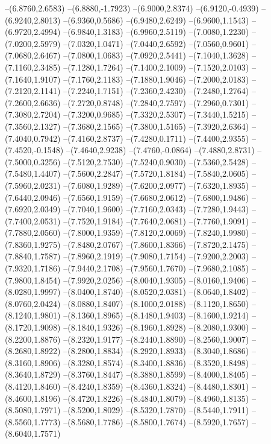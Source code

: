 {\begin{scope}
--(6.8760,2.6583)
--(6.8880,-1.7923)
--(6.9000,2.8374)
--(6.9120,-0.4939)
--(6.9240,2.8013)
--(6.9360,0.5686)
--(6.9480,2.6249)
--(6.9600,1.1543)
--(6.9720,2.4994)
--(6.9840,1.3183)
--(6.9960,2.5119)
--(7.0080,1.2230)
--(7.0200,2.5979)
--(7.0320,1.0471)
--(7.0440,2.6592)
--(7.0560,0.9601)
--(7.0680,2.6467)
--(7.0800,1.0683)
--(7.0920,2.5441)
--(7.1040,1.3628)
--(7.1160,2.3485)
--(7.1280,1.7264)
--(7.1400,2.1009)
--(7.1520,2.0103)
--(7.1640,1.9107)
--(7.1760,2.1183)
--(7.1880,1.9046)
--(7.2000,2.0183)
--(7.2120,2.1141)
--(7.2240,1.7151)
--(7.2360,2.4230)
--(7.2480,1.2764)
--(7.2600,2.6636)
--(7.2720,0.8748)
--(7.2840,2.7597)
--(7.2960,0.7301)
--(7.3080,2.7204)
--(7.3200,0.9685)
--(7.3320,2.5307)
--(7.3440,1.5215)
--(7.3560,2.1327)
--(7.3680,2.1565)
--(7.3800,1.5165)
--(7.3920,2.6364)
--(7.4040,0.7942)
--(7.4160,2.8737)
--(7.4280,0.1711)
--(7.4400,2.9355)
--(7.4520,-0.1548)
--(7.4640,2.9238)
--(7.4760,-0.0864)
--(7.4880,2.8731)
--(7.5000,0.3256)
--(7.5120,2.7530)
--(7.5240,0.9030)
--(7.5360,2.5428)
--(7.5480,1.4407)
--(7.5600,2.2847)
--(7.5720,1.8184)
--(7.5840,2.0605)
--(7.5960,2.0231)
--(7.6080,1.9289)
--(7.6200,2.0977)
--(7.6320,1.8935)
--(7.6440,2.0946)
--(7.6560,1.9159)
--(7.6680,2.0612)
--(7.6800,1.9486)
--(7.6920,2.0349)
--(7.7040,1.9600)
--(7.7160,2.0343)
--(7.7280,1.9443)
--(7.7400,2.0531)
--(7.7520,1.9184)
--(7.7640,2.0681)
--(7.7760,1.9091)
--(7.7880,2.0560)
--(7.8000,1.9359)
--(7.8120,2.0069)
--(7.8240,1.9980)
--(7.8360,1.9275)
--(7.8480,2.0767)
--(7.8600,1.8366)
--(7.8720,2.1475)
--(7.8840,1.7587)
--(7.8960,2.1919)
--(7.9080,1.7154)
--(7.9200,2.2003)
--(7.9320,1.7186)
--(7.9440,2.1708)
--(7.9560,1.7670)
--(7.9680,2.1085)
--(7.9800,1.8454)
--(7.9920,2.0256)
--(8.0040,1.9305)
--(8.0160,1.9406)
--(8.0280,1.9997)
--(8.0400,1.8740)
--(8.0520,2.0381)
--(8.0640,1.8402)
--(8.0760,2.0424)
--(8.0880,1.8407)
--(8.1000,2.0188)
--(8.1120,1.8650)
--(8.1240,1.9801)
--(8.1360,1.8965)
--(8.1480,1.9403)
--(8.1600,1.9214)
--(8.1720,1.9098)
--(8.1840,1.9326)
--(8.1960,1.8928)
--(8.2080,1.9300)
--(8.2200,1.8876)
--(8.2320,1.9177)
--(8.2440,1.8890)
--(8.2560,1.9007)
--(8.2680,1.8922)
--(8.2800,1.8834)
--(8.2920,1.8933)
--(8.3040,1.8686)
--(8.3160,1.8906)
--(8.3280,1.8574)
--(8.3400,1.8836)
--(8.3520,1.8498)
--(8.3640,1.8729)
--(8.3760,1.8447)
--(8.3880,1.8599)
--(8.4000,1.8405)
--(8.4120,1.8460)
--(8.4240,1.8359)
--(8.4360,1.8324)
--(8.4480,1.8301)
--(8.4600,1.8196)
--(8.4720,1.8226)
--(8.4840,1.8079)
--(8.4960,1.8135)
--(8.5080,1.7971)
--(8.5200,1.8029)
--(8.5320,1.7870)
--(8.5440,1.7911)
--(8.5560,1.7773)
--(8.5680,1.7786)
--(8.5800,1.7674)
--(8.5920,1.7657)
--(8.6040,1.7571)

\end{scope}}
